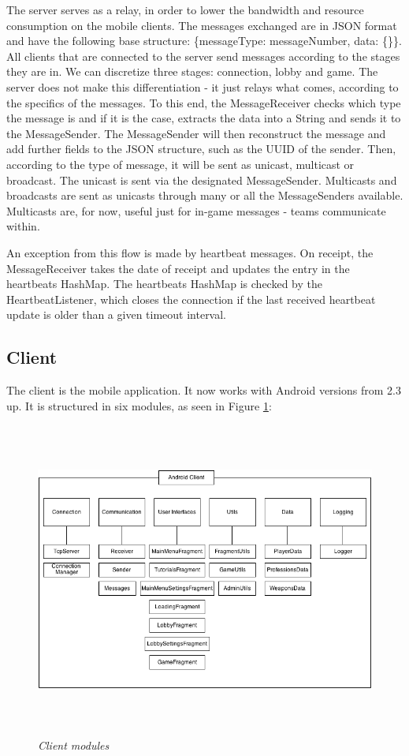 \documentclass{article}
\begin{document}
The server serves as a relay, in order to lower the bandwidth and
resource consumption on the mobile clients. The messages exchanged are in
JSON format and have the following base structure: \{messageType: messageNumber,
data: \{\}\}. All clients that are connected to the server send messages
according to the stages they are in. We can discretize three stages: connection,
lobby and game. The server does not make this differentiation - it just relays
what comes, according to the specifics of the messages. To this end, the
MessageReceiver checks which type the message is and if it is the case, extracts
the data into a String and sends it to the MessageSender. The MessageSender will
then reconstruct the message and add further fields to the JSON structure, such
as the UUID of the sender. Then, according to the type of message, it will be
sent as unicast, multicast or broadcast. The unicast is sent via the designated
MessageSender. Multicasts and broadcasts are sent as unicasts through many or
all the MessageSenders available. Multicasts are, for now, useful just for
in-game messages - teams communicate within.\newline

An exception from this flow is made by heartbeat messages. On receipt, the
MessageReceiver takes the date of receipt and updates the entry in the
heartbeats HashMap. The heartbeats HashMap is checked by the HeartbeatListener,
which closes the connection if the last received heartbeat update is older than
a given timeout interval.\newline


\subsection{Client}

The client is the mobile application. It now works with Android versions from
2.3 up. It is structured in six modules, as seen in Figure \ref{fig:clientModules}:

\begin{figure}
\includegraphics[height=4.08in,width=6.23in]{./images/diagrams/client_modules.png}  
\caption{\small \sl Client modules \label{fig:clientModules}}
\end{figure}
\end{document}
